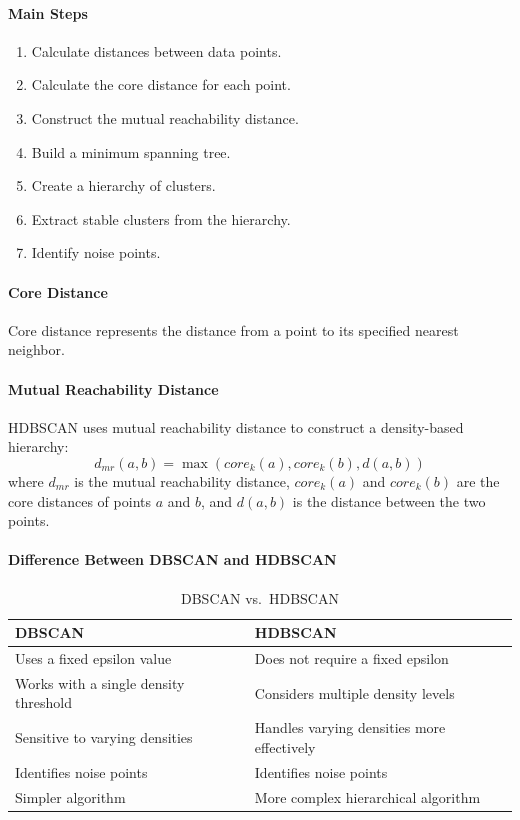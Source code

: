 \documentclass[a4paper,11pt]{article}
\begin{document}
\paragraph{Main Steps}
\begin{enumerate}
    \item Calculate distances between data points.
    \item Calculate the core distance for each point.
    \item Construct the mutual reachability distance.
    \item Build a minimum spanning tree.
    \item Create a hierarchy of clusters.
    \item Extract stable clusters from the hierarchy.
    \item Identify noise points.
\end{enumerate}

\paragraph{Core Distance}
Core distance represents the distance from a point to its specified nearest neighbor.

\paragraph{Mutual Reachability Distance}
HDBSCAN uses mutual reachability distance to construct a density-based hierarchy:
\[
d_{mr}(a, b) = \max(core_k(a), core_k(b), d(a, b))
\]
where $d_{mr}$ is the mutual reachability distance, $core_k(a)$ and $core_k(b)$ are the core distances of points $a$ and $b$, and $d(a, b)$ is the distance between the two points.

\paragraph{Difference Between DBSCAN and HDBSCAN}
\begin{table}[H]
\centering
\caption{DBSCAN vs.\ HDBSCAN}
\begin{tabular}{ll}
\toprule
\textbf{DBSCAN} & \textbf{HDBSCAN} \\
\midrule
Uses a fixed epsilon value         & Does not require a fixed epsilon \\
Works with a single density threshold & Considers multiple density levels \\
Sensitive to varying densities      & Handles varying densities more effectively \\
Identifies noise points             & Identifies noise points \\
Simpler algorithm                   & More complex hierarchical algorithm \\
\bottomrule
\end{tabular}
\end{table}
\end{document}
